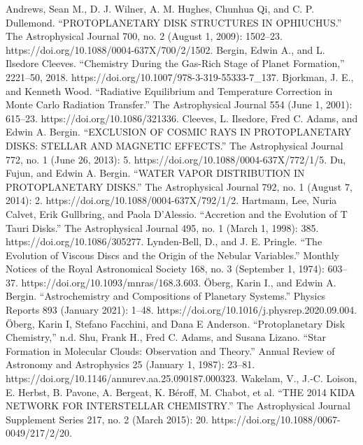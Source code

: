 \cleardoublepage
{}
{}
\begin{thebibliography}{99}

Andrews, Sean M., D. J. Wilner, A. M. Hughes, Chunhua Qi, and C. P. Dullemond. “PROTOPLANETARY DISK STRUCTURES IN OPHIUCHUS.” The Astrophysical Journal 700, no. 2 (August 1, 2009): 1502–23. https://doi.org/10.1088/0004-637X/700/2/1502.
Bergin, Edwin A., and L. Ilsedore Cleeves. “Chemistry During the Gas-Rich Stage of Planet Formation,” 2221–50, 2018. https://doi.org/10.1007/978-3-319-55333-7\_137.
Bjorkman, J. E., and Kenneth Wood. “Radiative Equilibrium and Temperature Correction in Monte Carlo Radiation Transfer.” The Astrophysical Journal 554 (June 1, 2001): 615–23. https://doi.org/10.1086/321336.
Cleeves, L. Ilsedore, Fred C. Adams, and Edwin A. Bergin. “EXCLUSION OF COSMIC RAYS IN PROTOPLANETARY DISKS: STELLAR AND MAGNETIC EFFECTS.” The Astrophysical Journal 772, no. 1 (June 26, 2013): 5. https://doi.org/10.1088/0004-637X/772/1/5.
Du, Fujun, and Edwin A. Bergin. “WATER VAPOR DISTRIBUTION IN PROTOPLANETARY DISKS.” The Astrophysical Journal 792, no. 1 (August 7, 2014): 2. https://doi.org/10.1088/0004-637X/792/1/2.
Hartmann, Lee, Nuria Calvet, Erik Gullbring, and Paola D’Alessio. “Accretion and the Evolution of T Tauri Disks.” The Astrophysical Journal 495, no. 1 (March 1, 1998): 385. https://doi.org/10.1086/305277.
Lynden-Bell, D., and J. E. Pringle. “The Evolution of Viscous Discs and the Origin of the Nebular Variables.” Monthly Notices of the Royal Astronomical Society 168, no. 3 (September 1, 1974): 603–37. https://doi.org/10.1093/mnras/168.3.603.
Öberg, Karin I., and Edwin A. Bergin. “Astrochemistry and Compositions of Planetary Systems.” Physics Reports 893 (January 2021): 1–48. https://doi.org/10.1016/j.physrep.2020.09.004.
Öberg, Karin I, Stefano Facchini, and Dana E Anderson. “Protoplanetary Disk Chemistry,” n.d.
Shu, Frank H., Fred C. Adams, and Susana Lizano. “Star Formation in Molecular Clouds: Observation and Theory.” Annual Review of Astronomy and Astrophysics 25 (January 1, 1987): 23–81. https://doi.org/10.1146/annurev.aa.25.090187.000323.
Wakelam, V., J.-C. Loison, E. Herbst, B. Pavone, A. Bergeat, K. Béroff, M. Chabot, et al. “THE 2014 KIDA NETWORK FOR INTERSTELLAR CHEMISTRY.” The Astrophysical Journal Supplement Series 217, no. 2 (March 2015): 20. https://doi.org/10.1088/0067-0049/217/2/20.





\end{thebibliography}
